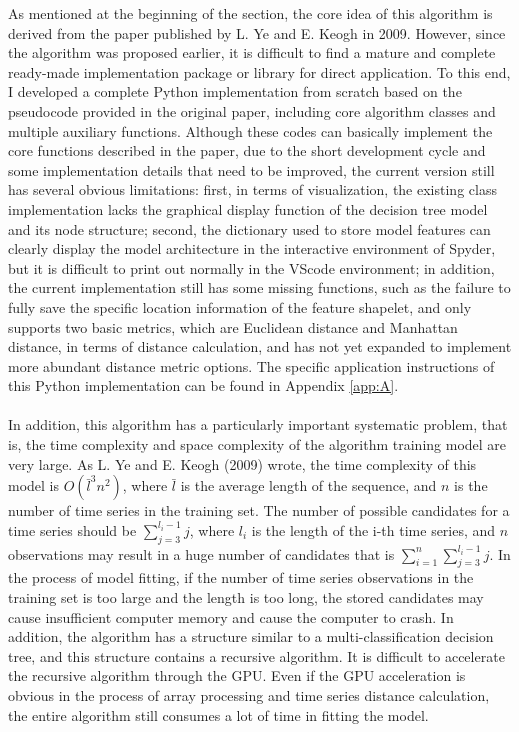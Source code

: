As mentioned at the beginning of the section, the core idea of this algorithm is derived from the paper published by L. Ye and E. Keogh in 2009. However, since the algorithm was proposed earlier, it is difficult to find a mature and complete ready-made implementation package or library for direct application. To this end, I developed a complete Python implementation from scratch based on the pseudocode provided in the original paper, including core algorithm classes and multiple auxiliary functions. Although these codes can basically implement the core functions described in the paper, due to the short development cycle and some implementation details that need to be improved, the current version still has several obvious limitations: first, in terms of visualization, the existing class implementation lacks the graphical display function of the decision tree model and its node structure; second, the dictionary used to store model features can clearly display the model architecture in the interactive environment of Spyder, but it is difficult to print out normally in the VScode environment; in addition, the current implementation still has some missing functions, such as the failure to fully save the specific location information of the feature shapelet, and only supports two basic metrics, which are Euclidean distance and Manhattan distance, in terms of distance calculation, and has not yet expanded to implement more abundant distance metric options. The specific application instructions of this Python implementation can be found in Appendix \ref{app:A}. \\
\\
In addition, this algorithm has a particularly important systematic problem, that is, the time complexity and space complexity of the algorithm training model are very large. As L. Ye and E. Keogh (2009) wrote, the time complexity of this model is $O(\bar{l}^3n^2)$, where $\bar{l}$ is the average length of the sequence, and $n$ is the number of time series in the training set. The number of possible candidates for a time series should be $\sum_{j=3}^{l_i-1} j$, where $l_i$ is the length of the i-th time series, and $n$ observations may result in a huge number of candidates that is $\sum_{i=1}^n\sum_{j=3}^{l_i-1} j$. In the process of model fitting, if the number of time series observations in the training set is too large and the length is too long, the stored candidates may cause insufficient computer memory and cause the computer to crash. In addition, the algorithm has a structure similar to a multi-classification decision tree, and this structure contains a recursive algorithm. It is difficult to accelerate the recursive algorithm through the GPU. Even if the GPU acceleration is obvious in the process of array processing and time series distance calculation, the entire algorithm still consumes a lot of time in fitting the model.\\
\\
